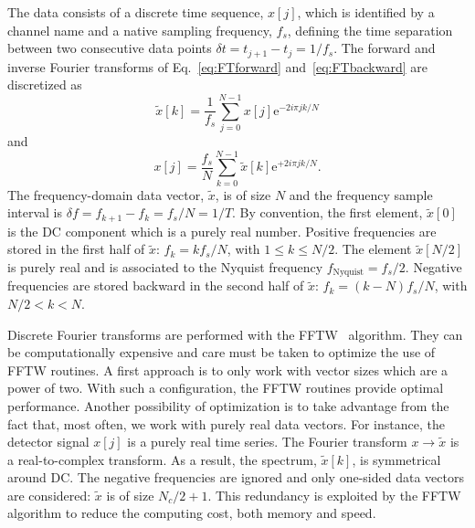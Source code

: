 \documentclass[aps]{revtex4-1}
\begin{document}
The data consists of a discrete time sequence, $x[j]$, which is identified by a channel name and a native sampling frequency, $f_s$, defining the time separation between two consecutive data points $\delta t = t_{j+1}-t_j = 1/f_s$. The forward and inverse Fourier transforms of Eq.~\ref{eq:FTforward} and~\ref{eq:FTbackward} are discretized as 
\begin{equation}
  \tilde{x}[k]=\frac{1}{f_s}\sum_{j=0}^{N-1}{x[j]\mathrm{e}^{-2i\pi jk/N}}
  \label{eq:dFTforward}
\end{equation}
and
\begin{equation}
  x[j]=\frac{f_s}{N}\sum_{k=0}^{N-1}{\tilde{x}[k]\mathrm{e}^{+2i\pi jk/N}}.
  \label{eq:dFTbackward}
\end{equation}
The frequency-domain data vector, $\tilde{x}$, is of size $N$ and the frequency sample interval is $\delta f = f_{k+1}-f_k = f_s/N = 1/T$. By convention, the first element, $\tilde{x}[0]$ is the DC component which is a purely real number. Positive frequencies are stored in the first half of $\tilde{x}$: $f_k=kf_s/N$, with $1\le k \le N/2$. The element $\tilde{x}[N/2]$ is purely real and is associated to the Nyquist frequency $f_{\text{Nyquist}}=f_s/2$. Negative frequencies are stored backward in the second half of $\tilde{x}$: $f_k=(k-N)f_s/N$, with $N/2 < k < N$.

Discrete Fourier transforms are performed with the FFTW~\cite{FFTW} algorithm. They can be computationally expensive and care must be taken to optimize the use of FFTW routines. A first approach is to only work with vector sizes which are a power of two. With such a configuration, the FFTW routines provide optimal performance. Another possibility of optimization is to take advantage from the fact that, most often, we work with purely real data vectors. For instance, the detector signal $x[j]$ is a purely real time series. The Fourier transform $x\rightarrow\tilde{x}$ is a real-to-complex transform. As a result, the spectrum, $\tilde{x}[k]$, is symmetrical around DC. The negative frequencies are ignored and only one-sided data vectors are considered: $\tilde{x}$ is of size $N_c/2+1$. This redundancy is exploited by the FFTW algorithm to reduce the computing cost, both memory and speed.


\end{document}
